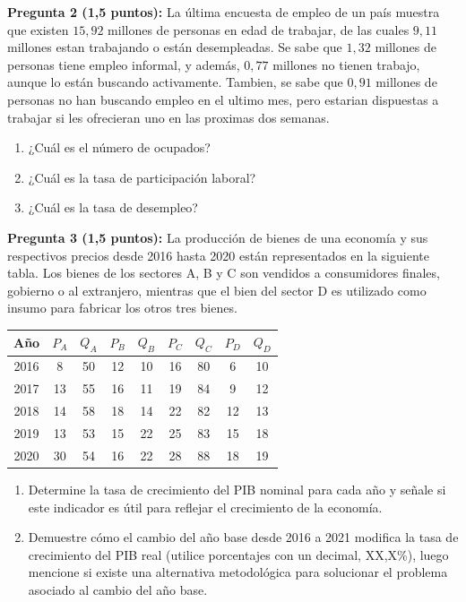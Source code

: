 \documentclass[11pt,addpoints]{article}
\begin{document}
\vspace{0.3cm}

\textbf{Pregunta 2 (1,5 puntos):}  
La última encuesta de empleo de un país muestra que existen $15,92$ millones de personas en edad de trabajar, de las cuales $9,11$ millones estan trabajando o están desempleadas. Se sabe que $1,32$ millones de personas tiene empleo informal, y además, $0,77$ millones no tienen trabajo, aunque lo están buscando activamente. Tambien, se sabe que $0,91$ millones de personas no han buscando empleo en el ultimo mes, pero estarian dispuestas a trabajar si les ofrecieran uno en las proximas dos semanas.

\begin{enumerate}[label=\alph*)]
    \item ¿Cuál es el número de ocupados?  
    \item ¿Cuál es la tasa de participación laboral?  
    \item ¿Cuál es la tasa de desempleo?  
\end{enumerate}

\vspace{0.3cm}

\textbf{Pregunta 3 (1,5 puntos):}
La producción de bienes de una economía y sus respectivos precios desde 2016 hasta 2020 están representados en la siguiente tabla. Los bienes de los sectores A, B y C son vendidos a consumidores finales, gobierno o al extranjero, mientras que el bien del sector D es utilizado como insumo para fabricar los otros tres bienes.

\begin{center}
\begin{tabular}{c c c c c c c c c}
\toprule
\textbf{Año} & $P_A$ & $Q_A$ & $P_B$ & $Q_B$ & $P_C$ & $Q_C$ & $P_D$ & $Q_D$ \\
\midrule
2016 & 8  & 50 & 12 & 10 & 16 & 80 & 6  & 10 \\
2017 & 13 & 55 & 16 & 11 & 19 & 84 & 9  & 12 \\
2018 & 14 & 58 & 18 & 14 & 22 & 82 & 12 & 13 \\
2019 & 13 & 53 & 15 & 22 & 25 & 83 & 15 & 18 \\
2020 & 30 & 54 & 16 & 22 & 28 & 88 & 18 & 19 \\
\bottomrule
\end{tabular}
\end{center}
\newpage
\vspace*{0.1cm}
\begin{enumerate}[label=\alph*)]
  \item Determine la tasa de crecimiento del PIB nominal para cada año y señale si este indicador es útil para reflejar el crecimiento de la economía.
  \item Demuestre cómo el cambio del año base desde 2016 a 2021 modifica la tasa de crecimiento del PIB real (utilice porcentajes con un decimal, XX,X\%), luego mencione si existe una alternativa metodológica para solucionar el problema asociado al cambio del año base.
\end{enumerate}
\end{document}
